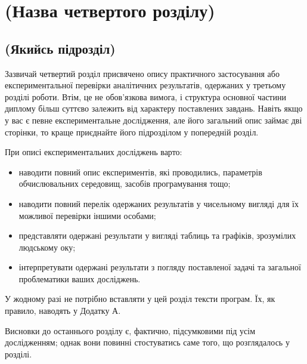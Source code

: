 \chapter{(Назва четвертого розділу)}
\label{chap:practice}

\section{(Якийсь підрозділ)}

Зазвичай четвертий розділ присвячено опису практичного застосування або 
експериментальної перевірки аналітичних результатів, одержаних у третьому 
розділі роботи. Втім, це не обов'язкова вимога, і структура основної 
частини диплому більш суттєво залежить від характеру поставлених завдань. 
Навіть якщо у вас є певне експериментальне дослідження, але його загальний 
опис займає дві сторінки, то краще приєднайте його підрозділом у 
попередній розділ.

При описі експериментальних досліджень варто:
\begin{itemize}
\item наводити повний опис експериментів, які проводились, параметрів 
обчислювальних середовищ, засобів програмування тощо;
\item наводити повний перелік одержаних результатів у чисельному вигляді для їх можливої 
перевірки іншими особами;
\item представляти одержані результати у вигляді таблиць та графіків, 
зрозумілих людському оку;
\item інтерпретувати одержані результати з погляду поставленої задачі 
та загальної проблематики ваших досліджень.
\end{itemize}

У жодному разі не потрібно вставляти у цей розділ тексти 
програм. Їх, як правило, наводять у Додатку А.


\chapconclude

Висновки до останнього розділу є, фактично, підсумковими під усім 
дослідженням; однак вони повинні стостуватись саме того, що розглядалось у 
розділі.